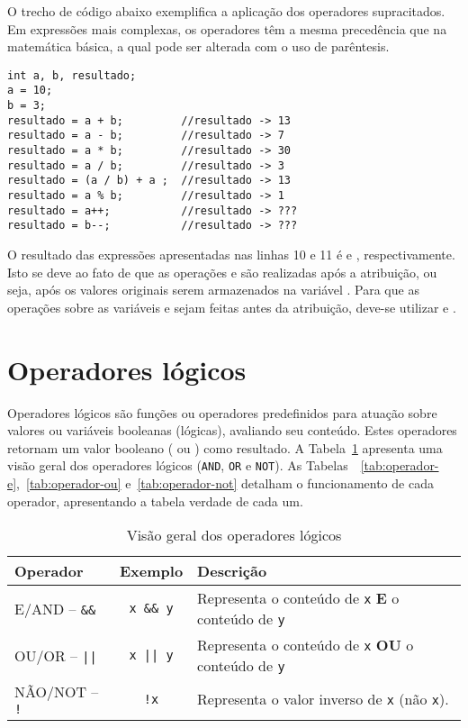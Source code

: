 O trecho de código abaixo exemplifica a aplicação dos operadores supracitados. Em expressões mais complexas, os operadores têm a mesma precedência que na matemática básica, a qual pode ser alterada com o uso de parêntesis.

\begin{verbatim}
int a, b, resultado;
a = 10;
b = 3;
resultado = a + b;         //resultado -> 13
resultado = a - b;         //resultado -> 7
resultado = a * b;         //resultado -> 30
resultado = a / b;         //resultado -> 3
resultado = (a / b) + a ;  //resultado -> 13
resultado = a % b;         //resultado -> 1
resultado = a++;           //resultado -> ???
resultado = b--;           //resultado -> ???
\end{verbatim}

O resultado das expressões apresentadas nas linhas 10 e 11 é  e , respectivamente. Isto se deve ao fato de que as operações  e  são realizadas após a atribuição, ou seja, após os valores originais serem armazenados na variável . Para que as operações sobre as variáveis  e  sejam feitas antes da atribuição, deve-se utilizar  e .

\section{Operadores lógicos}
Operadores lógicos são funções ou operadores predefinidos para atuação sobre valores ou variáveis booleanas (lógicas), avaliando seu conteúdo. Estes operadores retornam um valor booleano ( ou ) como resultado. A Tabela~\ref{tab:operadores-logicos} apresenta uma visão geral dos operadores lógicos (\texttt{AND}, \texttt{OR} e \texttt{NOT}). As Tabelas~~\ref{tab:operador-e},~\ref{tab:operador-ou} e~\ref{tab:operador-not} detalham o funcionamento de cada operador, apresentando a tabela verdade de cada um.

\begin{table}[H]
	\centering
	\begin{tabular}{l|c|l}
		\hline
		\textbf{Operador}       & \textbf{Exemplo}  & \textbf{Descrição}                               \\ \hline
		E/AND -- \texttt{\&\&} & \texttt{x \&\& y} & Representa o conteúdo de \texttt{x} \textbf{E} o conteúdo de \texttt{y}  \\
		
		OU/OR -- \texttt{||}   & \texttt{x || y}   & Representa o conteúdo de \texttt{x} \textbf{OU} o conteúdo de \texttt{y} \\
		
		NÃO/NOT -- \texttt{!}  & \texttt{!x}       & Representa o valor inverso de \texttt{x} (não \texttt{x}). \\ \hline
	\end{tabular}
	\caption{Visão geral dos operadores lógicos}
	\label{tab:operadores-logicos}
\end{table}

